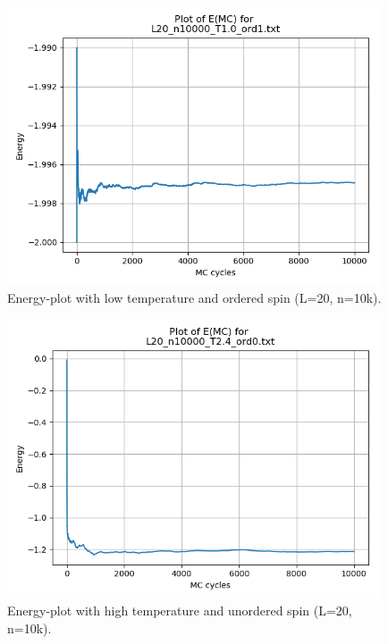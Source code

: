 \documentclass{article}
\begin{document}
    \begin{figure}[ht]
      \centering
      \includegraphics[width = 11cm]{img/energy_L20_n10000_T10_ord1.png}
      \caption{Energy-plot with low temperature and ordered spin (L=20, n=10k).}
      \label{fig:L20-energy-lowT-ord1}
    \end{figure}

    \begin{figure}[ht]
      \centering
      \includegraphics[width = 11cm]{img/energy_L20_n10000_T24_ord0.png}
      \caption{Energy-plot with high temperature and unordered spin (L=20, n=10k).}
      \label{fig:L20-energy-highT-ord0}
    \end{figure}
\end{document}
